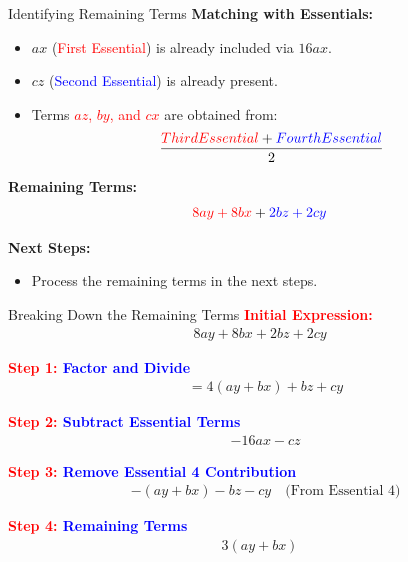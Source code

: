 \documentclass{beamer}
\begin{document}
\begin{frame}{Identifying Remaining Terms}
    \textbf{Matching with Essentials:}
    \begin{itemize}
        \item $ax$ (\textcolor{red}{First Essential}) is already included via $16ax$.
        \item $cz$ (\textcolor{blue}{Second Essential}) is already present.
        \item Terms \textcolor{red}{$az$, $by$, and $cx$} are obtained from:
        \begin{align*}
            \frac{\textcolor{red}{Third Essential} + \textcolor{blue}{Fourth Essential}}{2}
        \end{align*}
    \end{itemize}
    
    \textbf{Remaining Terms:}
    \begin{align*}
        \textcolor{red}{8ay + 8bx} + \textcolor{blue}{2bz + 2cy}
    \end{align*}
    
    \textbf{Next Steps:}
    \begin{itemize}
        \item Process the remaining terms in the next steps.
    \end{itemize}
\end{frame}


\begin{frame}{Breaking Down the Remaining Terms}
    \textbf{\textcolor{red}{Initial Expression:}}
    \begin{align*}
        8ay + 8bx + 2bz + 2cy
    \end{align*}
    
    \textbf{\textcolor{red}{Step 1:} \textcolor{blue}{Factor and Divide}}
    \begin{align*}
        &= 4(ay + bx) + bz + cy
    \end{align*}

    \textbf{\textcolor{red}{Step 2:} \textcolor{blue}{Subtract Essential Terms}}
    \begin{align*}
        &- 16ax - cz
    \end{align*}

    \textbf{\textcolor{red}{Step 3:} \textcolor{blue}{Remove Essential 4 Contribution}}
    \begin{align*}
        &-(ay + bx) - bz - cy \quad \text{(From Essential 4)}
    \end{align*}

    \textbf{\textcolor{red}{Step 4:} \textcolor{blue}{Remaining Terms}}
    \begin{align*}
        3(ay + bx)
    \end{align*}
\end{frame}
\end{document}
